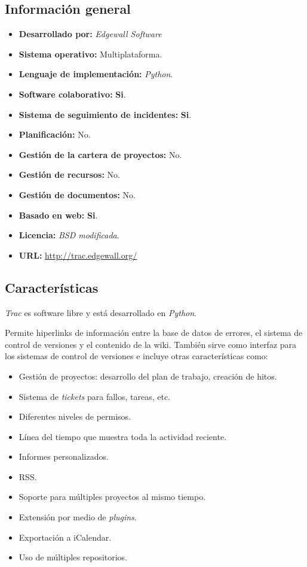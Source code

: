 \documentclass[11pt,a4paper,spanish,twoside]{report}
\begin{document}
  \subsection{Información general}
    \begin{itemize}
        \item\textbf{Desarrollado por:} \emph{Edgewall Software}
        \item\textbf{Sistema operativo:} Multiplataforma.
	\item\textbf{Lenguaje de implementación:} \emph{Python}.
        \item\textbf{Software colaborativo:} \textbf{Si}.
        \item\textbf{Sistema de seguimiento de incidentes:} \textbf{Si}.
	\item\textbf{Planificación:} No.
	\item\textbf{Gestión de la cartera de proyectos:} No.
	\item\textbf{Gestión de recursos:} No.
	\item\textbf{Gestión de documentos:} No.
	\item\textbf{Basado en web:} \textbf{Si}.
	\item\textbf{Licencia:} \emph{BSD modificada}.
	\item\textbf{URL:} \url{http://trac.edgewall.org/}
        \end{itemize}
	\subsection{Características}
        \emph{Trac} es software libre y está desarrollado en \emph{Python}.
        
        Permite hiperlinks de información entre la base de datos de errores,
        el sistema de control de versiones y el contenido de la wiki. También
        sirve como interfaz para los sistemas de control de versiones e
        incluye otras características como:

        \begin{itemize}
            \item Gestión de proyectos: desarrollo del plan de trabajo,
            creación de hitos.
            \item Sistema de \emph{tickets} para fallos, tareas, etc.
            \item Diferentes niveles de permisos.
            \item Línea del tiempo que muestra toda la actividad reciente.
            \item Informes personalizados.
            \item RSS.
            \item Soporte para múltiples proyectos al mismo tiempo.
            \item Extensión por medio de \emph{plugins}.
            \item Exportación a iCalendar.
            \item Uso de múltiples repositorios.
        \end{itemize}
        
\end{document}
